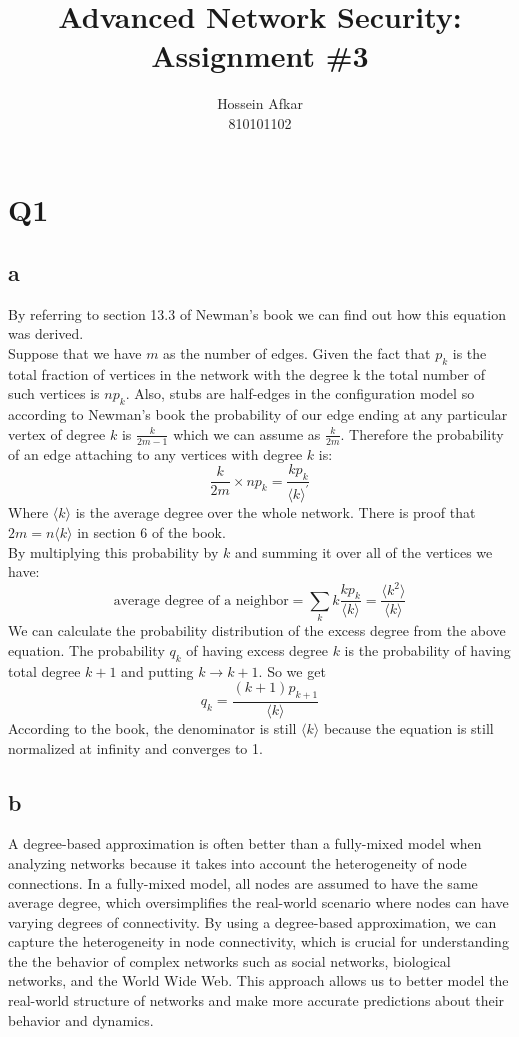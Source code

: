\documentclass[a4paper, 11pt]{article}
\title{Advanced Network Security: Assignment \#3}
\author{Hossein Afkar \\ 810101102}
\begin{document}
\maketitle
\section{Q1}
\subsection{a}
By referring to section 13.3 of Newman's book we can find out how
this equation was derived. \\
Suppose that we have $m$ as the number of edges. Given the fact that $p_k$ is
the total fraction of vertices in the network with the degree k the total number
of such vertices is $np_{k}$. Also, stubs are half-edges in the configuration model
so according to Newman's book the probability of our edge ending at any
particular vertex of degree $k$ is $\frac{k}{2m-1}$ which we can assume as
$\frac{k}{2m}$. Therefore the probability of an edge attaching to
any vertices with degree $k$ is:
\begin{equation}
    \frac{k}{2m} \times np_k = \frac{kp_k}{\langle k \rangle^{\prime}}
\end{equation}
Where $\langle k \rangle$ is the average degree over the whole network.
There is proof that $2m = n \langle k \rangle$ in section 6 of the book. \\
By multiplying this probability by $k$ and summing it over all of the vertices
we have:
\begin{equation}
    \text{average degree of a neighbor} =
    \sum_{k}k\frac{kp_k}{\langle k \rangle} =
    \frac{\langle k^2 \rangle}{\langle k \rangle}
\end{equation}
We can calculate the probability distribution of the excess degree from the
above equation. The probability $q_k$ of having excess degree $k$ is the
probability of having total degree $k+1$ and putting $k \rightarrow k + 1$.
So we get
\begin{equation}
    q_k = \frac{(k+1)p_{k+1}}{\langle k \rangle}
\end{equation}
According to the book, the denominator is still $\langle k \rangle$ because
the equation is still normalized at infinity and converges to 1.
\subsection{b}
A degree-based approximation is often better than a fully-mixed model
when analyzing networks because it takes into account the heterogeneity
of node connections. In a fully-mixed model,
all nodes are assumed to have the same average degree,
which oversimplifies the real-world scenario
where nodes can have varying degrees of connectivity.
By using a degree-based approximation,
we can capture the heterogeneity in node
connectivity, which is crucial for understanding the
the behavior of complex networks such as social networks, biological
networks, and the World Wide Web. This approach allows us to better model
the real-world structure of networks and make more accurate
predictions about their behavior and dynamics.
\end{document}
